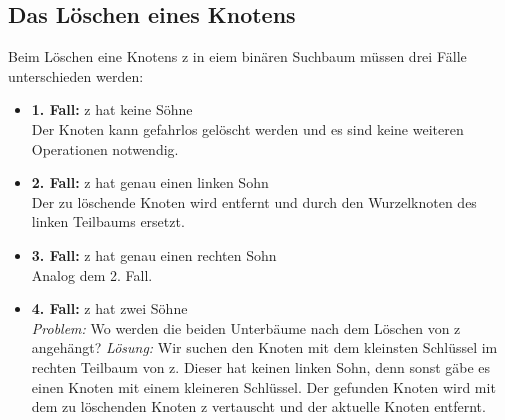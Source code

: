 \subsection{Das Löschen eines Knotens}
	Beim Löschen eine Knotens z in eiem binären Suchbaum müssen drei Fälle
	unterschieden werden:\
	\begin{itemize}
	 	\item \textbf{1. Fall:} z hat keine Söhne \\
	 	Der Knoten kann gefahrlos gelöscht werden und es sind
	 	keine weiteren Operationen notwendig.
	 	\centering
	 		
	 	 
	 	\item \textbf{2. Fall:} z hat genau einen linken Sohn \\
	 	Der zu löschende Knoten wird entfernt und durch den Wurzelknoten
	 	des linken Teilbaums ersetzt.
	 	\centering
	 		
	 	
	 	\item \textbf{3. Fall:} z hat genau einen rechten Sohn \\
		  Analog dem 2. Fall.
		\item \textbf{4. Fall:} z hat zwei Söhne \\
		\textit{Problem:} Wo werden die beiden Unterbäume nach dem Löschen von z
		angehängt?
		\textit{Lösung:} Wir suchen den Knoten mit dem kleinsten Schlüssel im rechten
		Teilbaum von z. Dieser hat keinen linken Sohn, denn sonst gäbe es einen
		Knoten mit einem kleineren Schlüssel. Der gefunden Knoten wird mit dem
		zu löschenden Knoten z vertauscht und der aktuelle Knoten entfernt.
	 	\centering
	 		
	 	
		\end{itemize}		 		

